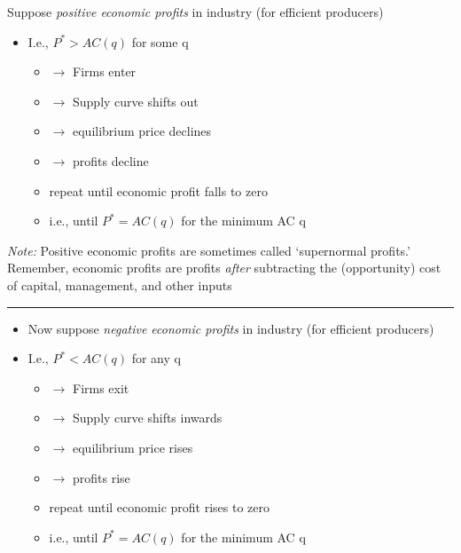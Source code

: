 \documentclass[]{article}
\providecommand{\tightlist}{%
  \setlength{\itemsep}{0pt}\setlength{\parskip}{0pt}}
\begin{document}
Suppose \emph{positive economic profits} in industry (for efficient
producers)

\begin{itemize}
\tightlist
\item
  I.e., \(P^*>AC(q)\) for some q

  \begin{itemize}
  \tightlist
  \item
    \(\rightarrow\) Firms enter
  \item
    \(\rightarrow\) Supply curve shifts out
  \item
    \(\rightarrow\) equilibrium price declines
  \item
    \(\rightarrow\) profits decline
  \item
    repeat until economic profit falls to zero
  \item
    i.e., until \(P^*=AC(q)\) for the minimum AC q
  \end{itemize}
\end{itemize}

\emph{Note:} Positive economic profits are sometimes called `supernormal
profits.'\\
Remember, economic profits are profits \emph{after} subtracting the
(opportunity) cost of capital, management, and other inputs

\begin{center}\rule{0.5\linewidth}{\linethickness}\end{center}

\begin{itemize}
\tightlist
\item
  Now suppose \emph{negative economic profits} in industry (for
  efficient producers)
\item
  I.e., \(P^*<AC(q)\) for any q

  \begin{itemize}
  \tightlist
  \item
    \(\rightarrow\) Firms exit
  \item
    \(\rightarrow\) Supply curve shifts inwards
  \item
    \(\rightarrow\) equilibrium price rises
  \item
    \(\rightarrow\) profits rise
  \item
    repeat until economic profit rises to zero
  \item
    i.e., until \(P^*=AC(q)\) for the minimum AC q
  \end{itemize}
\end{itemize}
\end{document}
